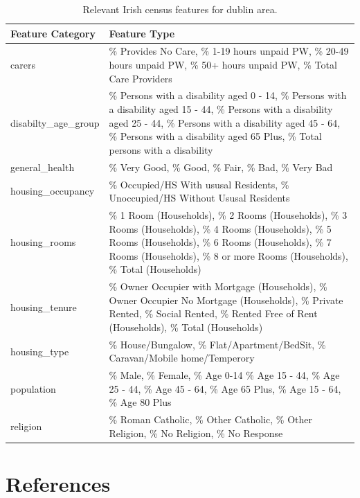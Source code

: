 \documentclass[]{elsarticle} %
\begin{document}
\begin{table}[t]

\caption{\label{tab:all-census-features}Relevant Irish census features for dublin area.}
\centering
\fontsize{8}{10}\selectfont
\begin{tabu} to 
\toprule
Feature Category & Feature Type\\
\midrule
carers & \% Provides No Care,                          
 \% 1-19 hours unpaid PW,                     
 \% 20-49 hours unpaid PW,                     
 \% 50+ hours unpaid PW,                      
 \% Total Care Providers\\
disabilty\_age\_group & \% Persons with a disability aged 0 - 14,      
 \% Persons with a disability aged 15 - 44,    
 \% Persons with a disability aged 25 - 44,   
 \% Persons with a disability aged 45 - 64,    
 \% Persons with a disability aged 65 Plus,   
 \% Total persons with a disability\\
general\_health & \% Very Good,                                
 \% Good,                                     
 \% Fair,                                     
 \% Bad,                                       
 \% Very Bad\\
housing\_occupancy & \% Occupied/HS With ususal Residents,         
 \%  Unoccupied/HS Without Ususal Residents\\
housing\_rooms & \% 1 Room (Households),                      
 \% 2 Rooms (Households),                      
 \% 3 Rooms (Households),                     
 \% 4 Rooms (Households),                      
 \% 5 Rooms (Households),                     
 \% 6 Rooms (Households),                      
 \% 7 Rooms (Households),                     
 \% 8 or more Rooms (Households),              
 \% Total (Households)\\
housing\_tenure & \% Owner Occupier with Mortgage (Households),
 \% Owner Occupier No Mortgage (Households),   
 \% Private Rented,                           
 \% Social Rented,                             
 \% Rented Free of Rent (Households),        
 \% Total (Households)\\
housing\_type & \% House/Bungalow,                           
 \% Flat/Apartment/BedSit,                     
 \% Caravan/Mobile home/Temperory\\
population & \% Male,
 \% Female,
 \% Age 0-14
 \% Age 15 - 44,    
 \% Age 25 - 44,   
 \% Age 45 - 64,    
 \% Age 65 Plus,
 \% Age 15 - 64, 
 \% Age 80 Plus\\
religion & \% Roman Catholic,
\% Other Catholic,
\% Other Religion,
\% No Religion,
\% No Response\\
\bottomrule
\end{tabu}
\end{table}

\section*{References}\label{references}
\end{document}

